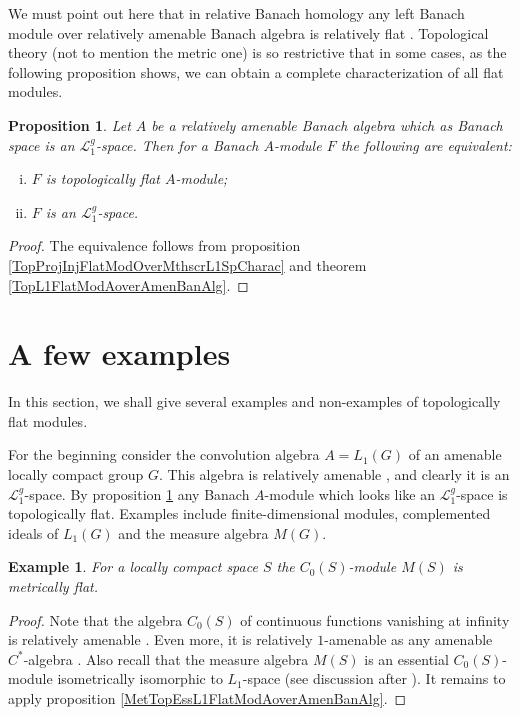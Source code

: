 \documentclass[12pt]{article}
\newtheorem{proposition}[theorem]{Proposition}
\newtheorem{example}[theorem]{Example}
\begin{document}
We must point out here that in relative Banach homology any left Banach module over relatively amenable Banach algebra is relatively flat \cite[theorem 7.1.60]{HelBanLocConvAlg}. Topological theory (not to mention the metric one) is so restrictive that in some cases, as the following proposition shows, we can obtain a complete characterization of all flat modules.

\begin{proposition}\label{TopFlatModAoverAmenL1BanAlgCharac} Let $A$ be a relatively amenable Banach algebra which as Banach space is an $\mathcal{L}_1^g$-space. Then for a Banach $A$-module $F$ the following are equivalent:
\begin{enumerate}[i)]
\item $F$ is topologically flat $A$-module;
\item $F$ is an $\mathcal{L}_1^g$-space.
\end{enumerate}
\end{proposition}
\begin{proof} The equivalence follows from proposition \ref{TopProjInjFlatModOverMthscrL1SpCharac} and theorem \ref{TopL1FlatModAoverAmenBanAlg}.
\end{proof}


\section{A few examples}
\label{SectionAFewExamples}

In this section, we shall give several examples and non-examples of topologically flat modules.

For the beginning consider the convolution algebra $A=L_1(G)$ of an amenable locally compact group $G$. This algebra is relatively amenable \cite[proposition VII.1.86]{HelBanLocConvAlg}, and clearly it is an $\mathcal{L}_1^g$-space. By proposition \ref{TopFlatModAoverAmenL1BanAlgCharac} any Banach $A$-module which looks like an $\mathcal{L}_1^g$-space is topologically flat. Examples include finite-dimensional modules, complemented ideals of $L_1(G)$ and the measure algebra $M(G)$.

\begin{example} For a locally compact space $S$ the $C_0(S)$-module $M(S)$ is metrically flat.
\end{example}
\begin{proof}
Note that the algebra $C_0(S)$ of continuous functions vanishing at infinity is relatively amenable \cite[theorem 7.1.87]{HelBanLocConvAlg}. Even more, it is relatively $1$-amenable as any amenable $C^*$-algebra \cite[example 2]{RundeAmenConstFour}. Also recall that the measure algebra $M(S)$ is an essential $C_0(S)$-module isometrically isomorphic to $L_1$-space (see discussion after \cite[proposition 2.14]{DalLauSecondDualOfMeasAlg}). It remains to apply proposition \ref{MetTopEssL1FlatModAoverAmenBanAlg}.
\end{proof}
\end{document}
